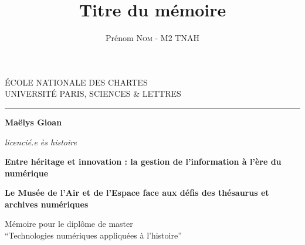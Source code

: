 \documentclass[12pt,twoside]{book}
\author{Prénom \textsc{Nom} - M2 TNAH}
\title{Titre du mémoire}
\begin{document}
	\begin{titlepage}
		\begin{center}
			
			\bigskip
			
			\begin{large}				
				ÉCOLE NATIONALE DES CHARTES\\
				UNIVERSITÉ PARIS, SCIENCES \& LETTRES
			\end{large}
			\begin{center}\rule{2cm}{0.02cm}\end{center}
			
			\bigskip
			\bigskip
			\bigskip
			\begin{Large}
				\textbf{Maëlys Gioan}\\
			\end{Large}
			\begin{normalsize} \textit{licencié.e ès histoire}\\
			\end{normalsize}
			
			\bigskip
			\bigskip
			\bigskip
			
			\begin{Huge}
				\textbf{Entre héritage et innovation : la gestion de l’information à l’ère du numérique}\\
			\end{Huge}
			\bigskip
			\bigskip
			\begin{LARGE}
				\textbf{Le Musée de l’Air et de l’Espace face aux défis des thésaurus et archives numériques}\\
			\end{LARGE}
			
			\bigskip
			\bigskip
			\bigskip
			\begin{large}
			\end{large}
			\vfill
			
			\begin{large}
				Mémoire 
				pour le diplôme de master \\
				\enquote{Technologies numériques appliquées à l'histoire} \\
			\end{large}
			
		\end{center}
	\end{titlepage}

	\thispagestyle{empty}	
	\cleardoublepage
	
\frontmatter
\end{document}
